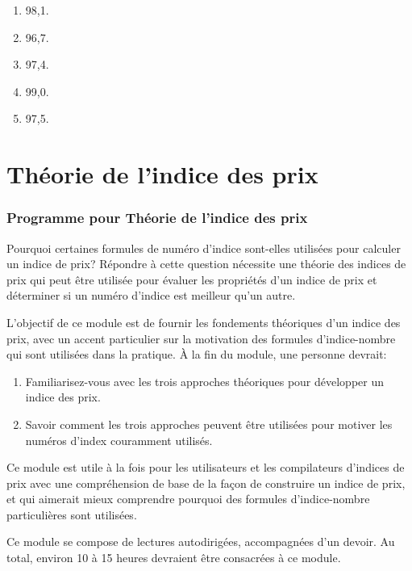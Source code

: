 \documentclass[
]{article}
\begin{document}
\begin{enumerate}
\def\labelenumi{\alph{enumi})}
\item
  98,1.
\item
  96,7.
\item
  97,4.
\item
  99,0.
\item
  97,5.
\end{enumerate}

\hypertarget{part-thuxe9orie-de-lindice-des-prix}{%
\part{Théorie de l'indice des prix}\label{part-thuxe9orie-de-lindice-des-prix}}

\hypertarget{programme-pour-thuxe9orie-de-lindice-des-prix}{%
\section{Programme pour Théorie de l'indice des prix}\label{programme-pour-thuxe9orie-de-lindice-des-prix}}

Pourquoi certaines formules de numéro d'indice sont-elles utilisées pour calculer un indice de prix? Répondre à cette question nécessite une théorie des indices de prix qui peut être utilisée pour évaluer les propriétés d'un indice de prix et déterminer si un numéro d'indice est meilleur qu'un autre.

L'objectif de ce module est de fournir les fondements théoriques d'un indice des prix, avec un accent particulier sur la motivation des formules d'indice-nombre qui sont utilisées dans la pratique. À la fin du module, une personne devrait:

\begin{enumerate}
\def\labelenumi{\arabic{enumi}.}
\item
  Familiarisez-vous avec les trois approches théoriques pour développer un indice des prix.
\item
  Savoir comment les trois approches peuvent être utilisées pour motiver les numéros d'index couramment utilisés.
\end{enumerate}

Ce module est utile à la fois pour les utilisateurs et les compilateurs d'indices de prix avec une compréhension de base de la façon de construire un indice de prix, et qui aimerait mieux comprendre pourquoi des formules d'indice-nombre particulières sont utilisées.

Ce module se compose de lectures autodirigées, accompagnées d'un devoir. Au total, environ 10 à 15 heures devraient être consacrées à ce module.
\end{document}

